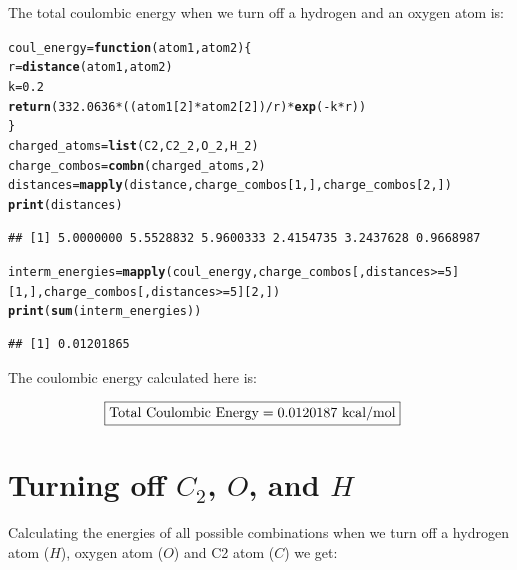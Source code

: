 \documentclass{article}\usepackage[]{graphicx}\usepackage[]{color}
\makeatletter
\newcommand{\hlnum}[1]{\textcolor[rgb]{0.686,0.059,0.569}{#1}}%
\newcommand{\hlopt}[1]{\textcolor[rgb]{0,0,0}{#1}}%
\newcommand{\hlstd}[1]{\textcolor[rgb]{0.345,0.345,0.345}{#1}}%
\newcommand{\hlkwa}[1]{\textcolor[rgb]{0.161,0.373,0.58}{\textbf{#1}}}%
\newcommand{\hlkwb}[1]{\textcolor[rgb]{0.69,0.353,0.396}{#1}}%
\newcommand{\hlkwc}[1]{\textcolor[rgb]{0.333,0.667,0.333}{#1}}%
\newcommand{\hlkwd}[1]{\textcolor[rgb]{0.737,0.353,0.396}{\textbf{#1}}}%
\newenvironment{kframe}{%
 \def\at@end@of@kframe{}%
 \ifinner\ifhmode%
  \def\at@end@of@kframe{\end{minipage}}%
  \begin{minipage}{\columnwidth}%
 \fi\fi%
 \def\FrameCommand##1{\hskip\@totalleftmargin \hskip-\fboxsep
 \colorbox{shadecolor}{##1}\hskip-\fboxsep
     \hskip-\linewidth \hskip-\@totalleftmargin \hskip\columnwidth}%
 \MakeFramed {\advance\hsize-\width
   \@totalleftmargin\z@ \linewidth\hsize
   \@setminipage}}%
 {\par\unskip\endMakeFramed%
 \at@end@of@kframe}
\newenvironment{knitrout}{}{} %
\makeatother
\begin{document}
The total coulombic energy when we turn off a hydrogen and an oxygen atom is:

\begin{knitrout}
\color{fgcolor}\begin{kframe}
\begin{alltt}
  \hlstd{coul_energy}\hlkwb{=}\hlkwa{function}\hlstd{(}\hlkwc{atom1}\hlstd{,}\hlkwc{atom2}\hlstd{)\{}
    \hlstd{r}\hlkwb{=}\hlkwd{distance}\hlstd{(atom1,atom2)}
    \hlstd{k}\hlkwb{=}\hlnum{0.2}
    \hlkwd{return}\hlstd{(}\hlnum{332.0636}\hlopt{*}\hlstd{((atom1[}\hlnum{2}\hlstd{]}\hlopt{*}\hlstd{atom2[}\hlnum{2}\hlstd{])}\hlopt{/}\hlstd{r)}\hlopt{*}\hlkwd{exp}\hlstd{(}\hlopt{-}\hlstd{k}\hlopt{*}\hlstd{r))}
  \hlstd{\}}
  \hlstd{charged_atoms} \hlkwb{=} \hlkwd{list}\hlstd{(C2,C2_2,O_2,H_2)}
  \hlstd{charge_combos} \hlkwb{=} \hlkwd{combn}\hlstd{(charged_atoms,}\hlnum{2}\hlstd{)}
  \hlstd{distances}\hlkwb{=}\hlkwd{mapply}\hlstd{(distance,charge_combos[}\hlnum{1}\hlstd{,],charge_combos[}\hlnum{2}\hlstd{,])}
  \hlkwd{print}\hlstd{(distances)}
\end{alltt}
\begin{verbatim}
## [1] 5.0000000 5.5528832 5.9600333 2.4154735 3.2437628 0.9668987
\end{verbatim}
\begin{alltt}
  \hlstd{interm_energies} \hlkwb{=} \hlkwd{mapply}\hlstd{(coul_energy,charge_combos[,distances}\hlopt{>=}\hlnum{5}\hlstd{][}\hlnum{1}\hlstd{,],charge_combos[,distances}\hlopt{>=}\hlnum{5}\hlstd{][}\hlnum{2}\hlstd{,])}
  \hlkwd{print}\hlstd{(}\hlkwd{sum}\hlstd{(interm_energies))}
\end{alltt}
\begin{verbatim}
## [1] 0.01201865
\end{verbatim}
\end{kframe}
\end{knitrout}

The coulombic energy calculated here is:

\begin{align*}
  \Aboxed{\text{Total Coulombic Energy}=0.0120187\ \text{kcal/mol}}
\end{align*}

\section{Turning off $C_2$, $O$, and $H$}

Calculating the energies of all possible combinations when we turn off a hydrogen atom ($H$), oxygen atom ($O$) and C2 atom ($C$) we get:
\end{document}
